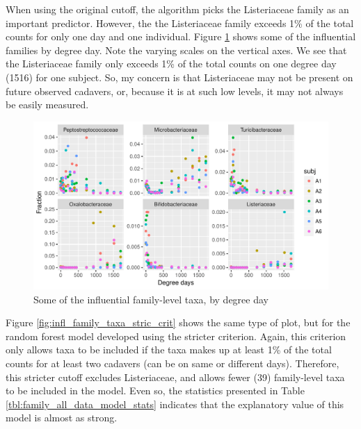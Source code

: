 \documentclass{article}
\begin{document}
When using the original cutoff, the algorithm picks the Listeriaceae
family as an important predictor.  However, the the Listeriaceae
family exceeds 1\% of the total counts for only one day and one
individual.  Figure \ref{fig:scatter_family_taxa} shows some of the
influential families by degree day.  Note the varying scales on the
vertical axes.  We see that the Listeriaceae family only exceeds 1\%
of the total counts on one degree day (1516) for one subject.  So, my
concern is that Listeriaceae may not be present on future observed
cadavers, or, because it is at such low levels, it may not always be
easily measured.

\begin{figure}
  \centering
  \includegraphics{../../only_families/all_time_steps/influential_family_taxa_panel}
  \caption{Some of the influential family-level taxa, by degree day}
  \label{fig:scatter_family_taxa}
\end{figure}

Figure \ref{fig:infl_family_taxa_stric_crit} shows the same type of
plot, but for the random forest model developed using the stricter
criterion.  Again, this criterion only allows taxa to be included if
the taxa makes up at least 1\% of the total counts for at least two
cadavers (can be on same or different days).  Therefore, this stricter
cutoff excludes Listeriaceae, and allows fewer (39) family-level taxa
to be included in the model.  Even so, the statistics presented in
Table \ref{tbl:family_all_data_model_stats} indicates that the
explanatory value of this model is almost as strong.
\end{document}
